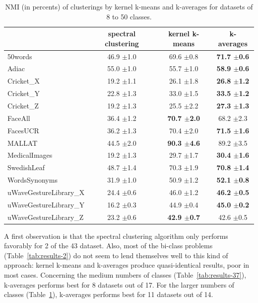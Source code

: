 \documentclass[natbib,smallextended]{svjour3}
\begin{document}

\begin{table}
\begin{center}
\caption{NMI (in percents) of clusterings by kernel k-means and k-averages for datasets of 8 to 50 classes.}
\label{tab:results-8}
\begin{tabular}{lccc}
 & spectral clustering & kernel k-means & k-averages \\
\hline
50words & 46.9 $\pm$1.0 & 69.6 $\pm$0.8 & \textbf{71.7 $\pm$0.6} \\
Adiac & 55.0 $\pm$1.0 & 55.7 $\pm$1.0 & \textbf{58.9 $\pm$0.6} \\
Cricket\_X & 19.2 $\pm$1.1 & 26.1 $\pm$1.8 & \textbf{26.8 $\pm$1.2} \\
Cricket\_Y & 22.8 $\pm$1.3 & 33.0 $\pm$1.5 & \textbf{33.5 $\pm$1.2} \\
Cricket\_Z & 19.2 $\pm$1.3 & 25.5 $\pm$2.2 & \textbf{27.3 $\pm$1.3} \\
FaceAll & 36.4 $\pm$1.2 & \textbf{70.7 $\pm$2.0} & 68.2 $\pm$2.3 \\
FacesUCR & 36.2 $\pm$1.3 & 70.4 $\pm$2.0 & \textbf{71.5 $\pm$1.6} \\
MALLAT & 44.5 $\pm$2.0 & \textbf{90.3 $\pm$4.6} & 89.2 $\pm$3.5 \\
MedicalImages & 19.2 $\pm$1.3 & 29.7 $\pm$1.7 & \textbf{30.4 $\pm$1.6} \\
SwedishLeaf & 48.7 $\pm$1.4 & 70.3 $\pm$1.9 & \textbf{70.8 $\pm$1.4} \\
WordsSynonyms & 31.9 $\pm$1.0 & 50.9 $\pm$1.2 & \textbf{52.1 $\pm$0.8} \\
uWaveGestureLibrary\_X & 24.4 $\pm$0.6 & 46.0 $\pm$1.2 & \textbf{46.2 $\pm$0.5} \\
uWaveGestureLibrary\_Y & 16.2 $\pm$0.3 & 44.9 $\pm$0.4 & \textbf{45.0 $\pm$0.2} \\
uWaveGestureLibrary\_Z & 23.2 $\pm$0.6 & \textbf{42.9 $\pm$0.7} & 42.6 $\pm$0.5 \\
\end{tabular}
\end{center}
\end{table}

A first observation is that the spectral clustering algorithm only performs favorably for 2 of the 43 dataset. Also, most of the bi-class problems (Table~\ref{tab:results-2}) do not seem to lend themselves well to this kind of approach: kernel k-means and k-averages produce quasi-identical results, poor in most cases. Concerning the medium numbers of classes (Table~\ref{tab:results-37}), k-averages performs best for 8 datasets out of 17. For the larger numbers of classes (Table~\ref{tab:results-8}), k-averages performs best for 11 datasets out of 14.
\end{document}
